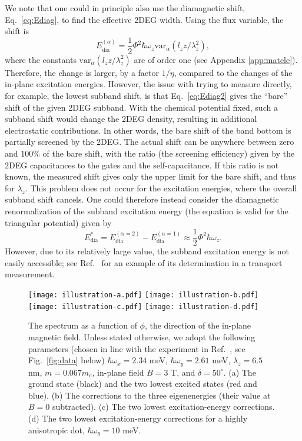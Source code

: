 \documentclass[aps,floatfix,twocolumn,showpacs,10pt,nofootinbib]{revtex4-1}
\newcommand{\be}{\begin{equation}}
\newcommand{\ee}{\end{equation}}
\begin{document}
We note that one could in principle also use the diamagnetic shift, Eq.~\eqref{eq:Ediag}, to find the effective 2DEG width. Using the flux variable, the shift is
\be
E_\textrm{dia}^{(\alpha)} = \frac{1}{2} \Phi^2 \hbar \omega_z \textrm{var}_\alpha(l_z z /\lambda_z^2),
\label{eq:Ediag2}
\ee
where the constants $\textrm{var}_\alpha(l_z z /\lambda_z^2)$ are of order one (see Appendix \ref{app:matele}). Therefore, the change is larger, by a factor $1/\eta$, compared to the changes of the in-plane excitation energies. However, the issue with trying to measure directly, for example, the lowest subband shift, is that Eq.~\eqref{eq:Ediag2} gives the ``bare'' shift of the given 2DEG subband. With the chemical potential fixed, such a subband shift would change the 2DEG density, resulting in additional electrostatic contributions. In other words, the bare shift of the band bottom is partially screened by the 2DEG. The actual shift can be anywhere between zero and 100\% of the bare shift,\cite{luo1990:PRB} with the ratio (the screening efficiency) given by the 2DEG capacitances to the gates and the self-capacitance.\cite{luryi1988:APL} If this ratio is not known, the measured shift gives only the upper limit for the bare shift, and thus for $\lambda_z$. This problem does not occur for the excitation energies, where the overall subband shift cancels. One could therefore instead consider the diamagnetic renormalization of the subband excitation energy (the equation is valid for the triangular potential) given by
\be
E^*_\textrm{dia} = E^{(\alpha=2)}_\textrm{dia} - E^{(\alpha=1)}_\textrm{dia} \approx \frac{1}{2} \Phi^2 \hbar \omega_z.
\ee
However, due to its relatively large value, the subband excitation energy is not easily accessible; see Ref.~ for an example of its determination in a transport measurement.

\begin{figure}
\texttt{[image: illustration-a.pdf]}
\texttt{[image: illustration-b.pdf]}
\texttt{[image: illustration-c.pdf]}
\texttt{[image: illustration-d.pdf]}
\caption{\label{fig:illustration}
The spectrum as a function of $\phi$, the direction of the in-plane magnetic field. Unless stated otherwise, we adopt the following parameters (chosen in line with the experiment in Ref.~, see Fig.~\ref{fig:data} below)
 $\hbar \omega_x=2.34$ meV, $\hbar \omega_y=2.61$ meV, 
$\lambda_z=6.5$ nm,
$m=0.067 m_e$, in-plane field $B=3$ T, and $\delta=50^\circ$. (a) The ground state (black) and the two lowest excited states (red and blue). (b) The corrections to the three eigenenergies (their value at $B=0$ subtracted). (c) The two lowest excitation-energy corrections. (d) The two lowest excitation-energy corrections for a highly anisotropic dot, $\hbar \omega_y=10$ meV.}
\end{figure}
\end{document}
